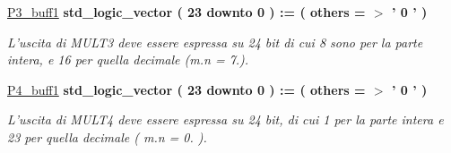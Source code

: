 \begin{DoxyCompactItemize}
\hyperlink{group___linear_regression_ga70180d04f093d439774c11c332debaab}{P3\+\_\+buff1} {\bfseries \textcolor{vhdlchar}{std\+\_\+logic\+\_\+vector}\textcolor{vhdlchar}{ }\textcolor{vhdlchar}{(}\textcolor{vhdlchar}{ }\textcolor{vhdlchar}{ } \textcolor{vhdldigit}{23} \textcolor{vhdlchar}{ }\textcolor{vhdlchar}{downto}\textcolor{vhdlchar}{ }\textcolor{vhdlchar}{ } \textcolor{vhdldigit}{0} \textcolor{vhdlchar}{ }\textcolor{vhdlchar}{)}\textcolor{vhdlchar}{ }\textcolor{vhdlchar}{ }\textcolor{vhdlchar}{ }\textcolor{vhdlchar}{\+:}\textcolor{vhdlchar}{=}\textcolor{vhdlchar}{ }\textcolor{vhdlchar}{(}\textcolor{vhdlchar}{ }\textcolor{vhdlchar}{ }\textcolor{vhdlchar}{others}\textcolor{vhdlchar}{ }\textcolor{vhdlchar}{ }\textcolor{vhdlchar}{=}\textcolor{vhdlchar}{ }\textcolor{vhdlchar}{$>$}\textcolor{vhdlchar}{ }\textcolor{vhdlchar}{'}\textcolor{vhdlchar}{ } \textcolor{vhdldigit}{0} \textcolor{vhdlchar}{ }\textcolor{vhdlchar}{'}\textcolor{vhdlchar}{ }\textcolor{vhdlchar}{)}\textcolor{vhdlchar}{ }} 
\begin{DoxyCompactList}\small\item\em L'uscita di M\+U\+L\+T3 deve essere espressa su 24 bit di cui 8 sono per la parte intera, e 16 per quella decimale (m.\+n = 7.). \end{DoxyCompactList}\item 
\hyperlink{group___linear_regression_ga585547e50aaeb76d801f21626a57c3d2}{P4\+\_\+buff1} {\bfseries \textcolor{vhdlchar}{std\+\_\+logic\+\_\+vector}\textcolor{vhdlchar}{ }\textcolor{vhdlchar}{(}\textcolor{vhdlchar}{ }\textcolor{vhdlchar}{ } \textcolor{vhdldigit}{23} \textcolor{vhdlchar}{ }\textcolor{vhdlchar}{downto}\textcolor{vhdlchar}{ }\textcolor{vhdlchar}{ } \textcolor{vhdldigit}{0} \textcolor{vhdlchar}{ }\textcolor{vhdlchar}{)}\textcolor{vhdlchar}{ }\textcolor{vhdlchar}{ }\textcolor{vhdlchar}{ }\textcolor{vhdlchar}{\+:}\textcolor{vhdlchar}{=}\textcolor{vhdlchar}{ }\textcolor{vhdlchar}{(}\textcolor{vhdlchar}{ }\textcolor{vhdlchar}{ }\textcolor{vhdlchar}{others}\textcolor{vhdlchar}{ }\textcolor{vhdlchar}{ }\textcolor{vhdlchar}{=}\textcolor{vhdlchar}{ }\textcolor{vhdlchar}{$>$}\textcolor{vhdlchar}{ }\textcolor{vhdlchar}{'}\textcolor{vhdlchar}{ } \textcolor{vhdldigit}{0} \textcolor{vhdlchar}{ }\textcolor{vhdlchar}{'}\textcolor{vhdlchar}{ }\textcolor{vhdlchar}{)}\textcolor{vhdlchar}{ }} 
\begin{DoxyCompactList}\small\item\em L'uscita di M\+U\+L\+T4 deve essere espressa su 24 bit, di cui 1 per la parte intera e 23 per quella decimale ( m.\+n = 0. ). \end{DoxyCompactList}\item 

\end{DoxyCompactItemize}
